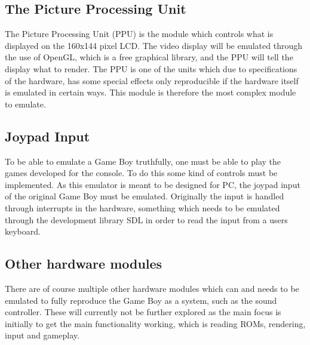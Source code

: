 \subsection{The Picture Processing Unit} 
The Picture Processing Unit (PPU) is the module which controls what is displayed on the 160x144 pixel LCD.\cite{pandocsVideo} The video display will be emulated through the use of OpenGL\cite{OpenGL}, which is a free graphical library, and the PPU will tell the display what to render. The PPU is one of the units which due to specifications of the hardware, has some special effects only reproducible if the hardware itself is emulated in certain ways. This module is therefore the most complex module to emulate. %


\subsection{Joypad Input}
To be able to emulate a Game Boy truthfully, one must be able to play the games developed for the console. To do this some kind of controls must be implemented. As this emulator is meant to be designed for PC, the joypad input of the original Game Boy must be emulated. Originally the input is handled through interrupts in the hardware\cite{pandocsinterrupts}\cite{pandocsjoypad}, something which needs to be emulated through the development library SDL\cite{SDL} in order to read the input from a users keyboard.


\subsection{Other hardware modules}

There are of course multiple other hardware modules which can and needs to be emulated to fully reproduce the Game Boy as a system, such as the sound controller. These will currently not be further explored as the main focus is initially to get the main functionality working, which is reading ROMs, rendering, input and gameplay. 


